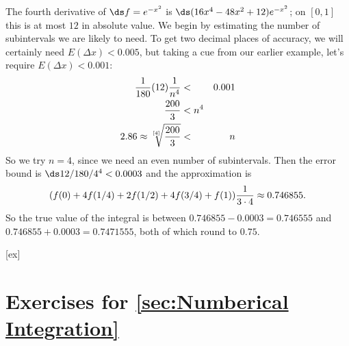 \begin{solution}
The fourth derivative of $\ds f=e^{-x^2}$ is
$\ds(16x^4-48x^2+12)e^{-x^2}$; on $[0,1]$ this is at most
$12$ in absolute value.  We begin by estimating the number of
subintervals we are likely to need. To get two decimal places of
accuracy, we will certainly need $E(\Delta x)<0.005$, but taking a cue
from our earlier example, let's require $E(\Delta x)<0.001$:
\begin{eqnarray*}
  {1\over180}(12){1\over n^4} &<& 0.001\cr
  {200\over3}&<n^4\cr
  2.86\approx\root[4] \of {200\over3}&<&n
\end{eqnarray*}
So we try $n=4$, since we need an even number of subintervals. Then
the error bound is $\ds12/180/4^4<0.0003$ and the approximation is
$$
  (f(0)+4f(1/4)+2f(1/2)+4f(3/4)+f(1)){1\over3\cdot4}
  \approx 0.746855.
$$
So the true value of the integral is between $0.746855-0.0003=0.746555$ and
$0.746855+0.0003=0.7471555$, both of which round to $0.75$.
\end{solution}



[ex]
\section*{Exercises for \ref{sec:Numberical Integration}}

